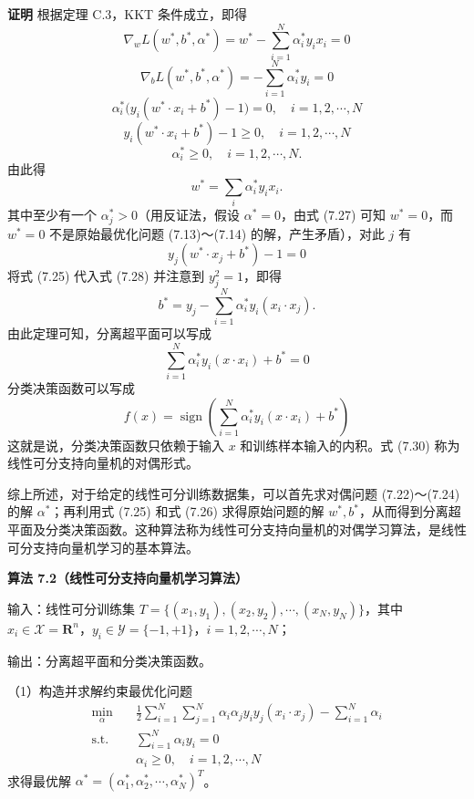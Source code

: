 \documentclass[UTF8, 12pt, fontset=fandol, oneside]{ctexart}
\begin{document}
\noindent\textbf{证明}\quad
根据定理 C.3，KKT 条件成立，即得
\[
\nabla_w L(w^*,b^*,\alpha^*)=w^*-\sum_{i=1}^N\alpha_i^*y_i x_i=0
\]
\[
\nabla_b L(w^*,b^*,\alpha^*)=-\sum_{i=1}^N\alpha_i^*y_i=0
\]
\[
\alpha_i^*\bigl(y_i(w^*\cdot x_i+b^*)-1\bigr)=0,\quad i=1,2,\cdots,N
\]
\[
y_i(w^*\cdot x_i+b^*)-1\geq 0,\quad i=1,2,\cdots,N
\]
\[
\alpha_i^*\geq 0,\quad i=1,2,\cdots,N.
\]
由此得
\[
w^*=\sum_i\alpha_i^*y_i x_i.
\]
其中至少有一个 $\alpha_j^*>0$（用反证法，假设 $\alpha^*=0$，由式 (7.27) 可知 $w^*=0$，而 $w^*=0$ 不是原始最优化问题 (7.13)～(7.14) 的解，产生矛盾），对此 $j$ 有
\begin{equation}
y_j(w^*\cdot x_j+b^*)-1=0
\tag{7.28}
\end{equation}
将式 (7.25) 代入式 (7.28) 并注意到 $y_j^2=1$，即得
\[
b^*=y_j-\sum_{i=1}^N\alpha_i^*y_i(x_i\cdot x_j).
\]
由此定理可知，分离超平面可以写成
\begin{equation}
\sum_{i=1}^N\alpha_i^*y_i(x\cdot x_i)+b^*=0
\tag{7.29}
\end{equation}
分类决策函数可以写成
\begin{equation}
f(x)=\operatorname{sign}\left(\sum_{i=1}^N\alpha_i^*y_i(x\cdot x_i)+b^*\right)
\tag{7.30}
\end{equation}
这就是说，分类决策函数只依赖于输入 $x$ 和训练样本输入的内积。式 (7.30) 称为线性可分支持向量机的对偶形式。

综上所述，对于给定的线性可分训练数据集，可以首先求对偶问题 (7.22)～(7.24) 的解 $\alpha^*$；再利用式 (7.25) 和式 (7.26) 求得原始问题的解 $w^*,b^*$，从而得到分离超平面及分类决策函数。这种算法称为线性可分支持向量机的对偶学习算法，是线性可分支持向量机学习的基本算法。

\noindent\textbf{算法 7.2（线性可分支持向量机学习算法）}

输入：线性可分训练集 $T=\{(x_1,y_1),(x_2,y_2),\cdots,(x_N,y_N)\}$，其中 $x_i\in\mathcal{X}=\mathbf{R}^n$，$y_i\in\mathcal{Y}=\{-1,+1\}$，$i=1,2,\cdots,N$；

输出：分离超平面和分类决策函数。

（1）构造并求解约束最优化问题
\[
\begin{aligned}
\min_\alpha\quad & \frac{1}{2}\sum_{i=1}^N\sum_{j=1}^N\alpha_i\alpha_j y_i y_j(x_i\cdot x_j)-\sum_{i=1}^N\alpha_i\\
\mathrm{s.t.}\quad & \sum_{i=1}^N\alpha_i y_i=0\\
& \alpha_i\geq 0,\quad i=1,2,\cdots,N
\end{aligned}
\]
求得最优解 $\alpha^*=(\alpha_1^*,\alpha_2^*,\cdots,\alpha_N^*)^T$。
\end{document}
